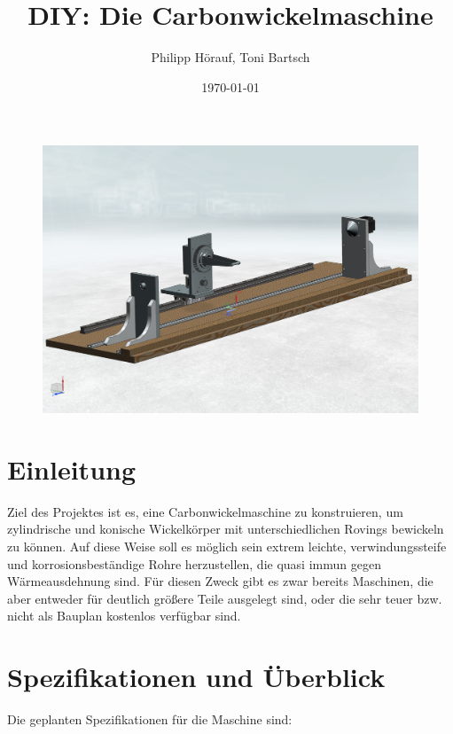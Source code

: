 \documentclass[paper=A4,pagesize,DIV=18, 12pt,listof=totoc,bibliography=totoc,headings=optiontohead,open=any]{article}
\date{\today}
\author{Philipp Hörauf, Toni Bartsch}
\title{DIY: Die Carbonwickelmaschine}
\begin{document}
\maketitle
\thispagestyle{empty}
\vspace*{15mm}
\begin{figure}[H]
	\centering
	\includegraphics[width=1\textwidth]{NX_Screenshots/gesamt3.png}
\end{figure}


\newpage
\tableofcontents
\newpage

\section{Einleitung}
Ziel des Projektes ist es, eine Carbonwickelmaschine zu konstruieren, um zylindrische und konische Wickelkörper mit unterschiedlichen Rovings bewickeln zu können. Auf diese Weise soll es möglich sein extrem leichte, verwindungssteife und korrosionsbeständige Rohre herzustellen, die quasi immun gegen Wärmeausdehnung sind. Für diesen Zweck gibt es zwar bereits Maschinen, die aber entweder für deutlich größere Teile ausgelegt sind, oder die sehr teuer bzw. nicht als Bauplan kostenlos verfügbar sind.

\section{Spezifikationen und Überblick}
Die geplanten Spezifikationen für die Maschine sind:
\end{document}
